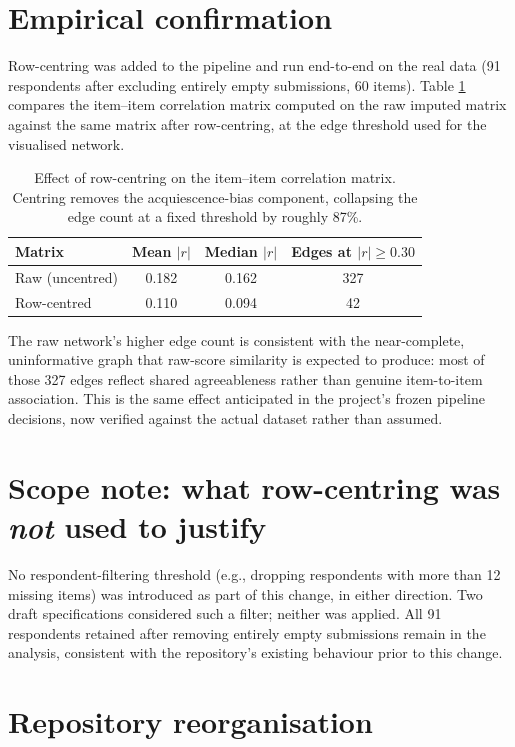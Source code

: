 \documentclass[11pt]{article}
\begin{document}
\section{Empirical confirmation}

Row-centring was added to the pipeline and run end-to-end on the real data
(91 respondents after excluding entirely empty submissions, 60 items). Table
\ref{tab:centring-effect} compares the item--item correlation matrix computed
on the raw imputed matrix against the same matrix after row-centring, at the
edge threshold used for the visualised network.

\begin{table}[h]
\centering
\begin{tabular}{lccc}
\toprule
Matrix & Mean $|r|$ & Median $|r|$ & Edges at $|r| \ge 0.30$ \\
\midrule
Raw (uncentred)   & 0.182 & 0.162 & 327 \\
Row-centred       & 0.110 & 0.094 & 42 \\
\bottomrule
\end{tabular}
\caption{Effect of row-centring on the item--item correlation matrix. Centring
removes the acquiescence-bias component, collapsing the edge count at a fixed
threshold by roughly 87\%.}
\label{tab:centring-effect}
\end{table}

The raw network's higher edge count is consistent with the near-complete,
uninformative graph that raw-score similarity is expected to produce: most of
those 327 edges reflect shared agreeableness rather than genuine item-to-item
association. This is the same effect anticipated in the project's frozen
pipeline decisions, now verified against the actual dataset rather than
assumed.

\section{Scope note: what row-centring was \emph{not} used to justify}

No respondent-filtering threshold (e.g., dropping respondents with more than
12 missing items) was introduced as part of this change, in either direction.
Two draft specifications considered such a filter; neither was applied. All
91 respondents retained after removing entirely empty submissions remain in
the analysis, consistent with the repository's existing behaviour prior to
this change.

\section{Repository reorganisation}
\end{document}
